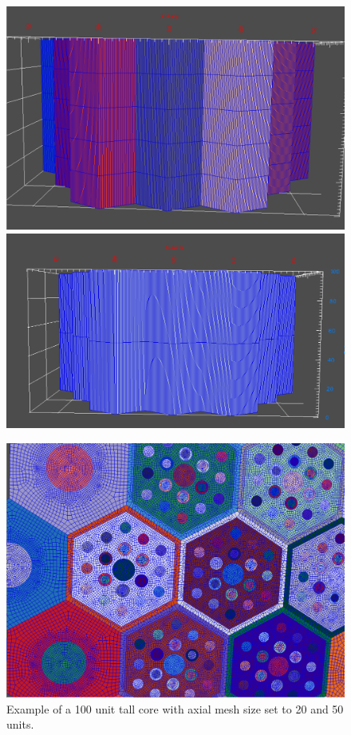 \begin{figure}[h]
\centering
\begin{minipage}{.45\textwidth}
  \centering
	\includegraphics[width=0.95\linewidth]{Images/axial-mesh-20.png}
	\includegraphics[width=0.95\linewidth]{Images/axial-mesh-50.png}
	\caption{Example of a 100 unit tall core with axial mesh size set to 20 and 50 units.}
	\label{fig:AxialMesh}
\end{minipage} \hspace{.5cm}%
\begin{minipage}{.45\textwidth}
  \centering
	\includegraphics[width=0.95\linewidth]{Images/edge-interval-20.png}

\end{minipage}
\end{figure}
